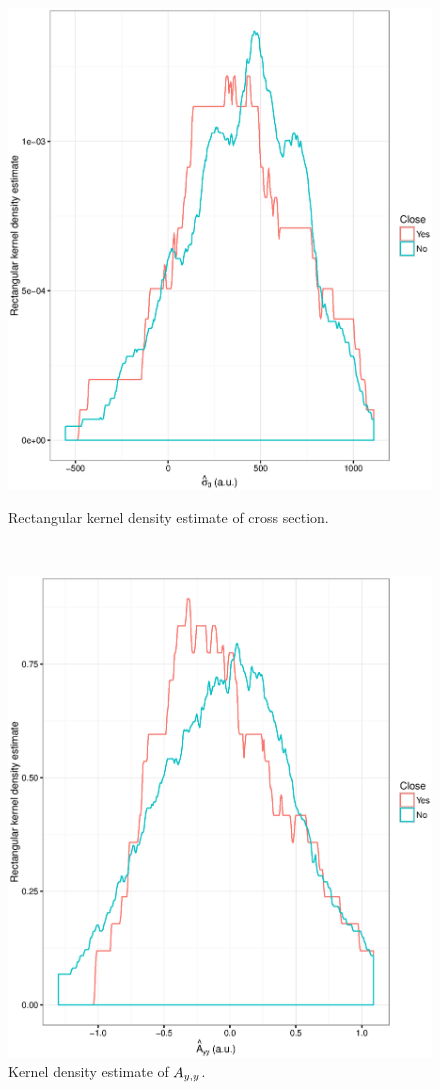 \documentclass{article}
\begin{document}
\begin{figure}[h]
	\centering
	\begin{minipage}{.5\textwidth}
		\centering
		\includegraphics[scale=.5]{CS0_au_dens.eps}
		\caption{Rectangular kernel density estimate of cross section.\label{fig:CS0au_dens}}
	\end{minipage}~~~~ %
	\begin{minipage}{.5\textwidth}
		\centering
		\includegraphics[scale=.5]{Ayy_dens.eps}
		\caption{Kernel density estimate of $\Ayy$.\label{fig:Ayy_dens}}
	\end{minipage}
	

\end{figure}
\end{document}
